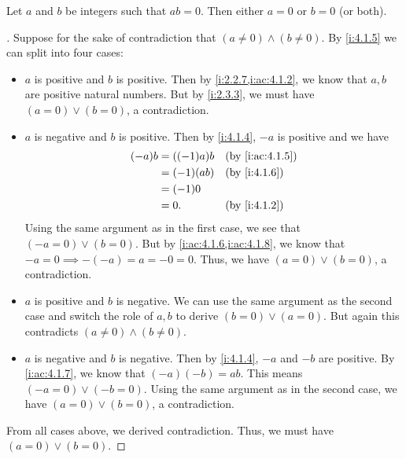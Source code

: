 \begin{prop}\label{i:4.1.8}
  Let \(a\) and \(b\) be integers such that \(ab = 0\).
  Then either \(a = 0\) or \(b = 0\) (or both).
\end{prop}

\begin{proof}[]
  Suppose for the sake of contradiction that \((a \neq 0) \land (b \neq 0)\).
  By \cref{i:4.1.5} we can split into four cases:
  \begin{itemize}
    \item \(a\) is positive and \(b\) is positive.
          Then by \cref{i:2.2.7,i:ac:4.1.2}, we know that \(a, b\) are positive natural numbers.
          But by \cref{i:2.3.3}, we must have \((a = 0) \lor (b = 0)\), a contradiction.
    \item \(a\) is negative and \(b\) is positive.
          Then by \cref{i:4.1.4}, \(-a\) is positive and we have
          \begin{align*}
            (-a) b & = ((-1) a) b &  & \by{i:ac:4.1.5} \\
                   & = (-1) (ab)  &  & \by{i:4.1.6}    \\
                   & = (-1) 0                          \\
                   & = 0.         &  & \by{i:4.1.2}
          \end{align*}
          Using the same argument as in the first case, we see that \((-a = 0) \lor (b = 0)\).
          But by \cref{i:ac:4.1.6,i:ac:4.1.8}, we know that \(-a = 0 \implies -(-a) = a = -0 = 0\).
          Thus, we have \((a = 0) \lor (b = 0)\), a contradiction.
    \item \(a\) is positive and \(b\) is negative.
          We can use the same argument as the second case and switch the role of \(a, b\) to derive \((b = 0) \lor (a = 0)\).
          But again this contradicts \((a \neq 0) \land (b \neq 0)\).
    \item \(a\) is negative and \(b\) is negative.
          Then by \cref{i:4.1.4}, \(-a\) and \(-b\) are positive.
          By \cref{i:ac:4.1.7}, we know that \((-a)(-b) = ab\).
          This means \((-a = 0) \lor (-b = 0)\).
          Using the same argument as in the second case, we have \((a = 0) \lor (b = 0)\), a contradiction.
  \end{itemize}
  From all cases above, we derived contradiction.
  Thus, we must have \((a = 0) \lor (b = 0)\).
\end{proof}

